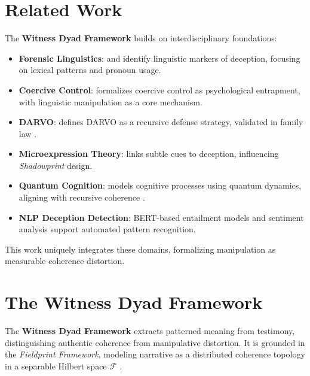 \documentclass[11pt]{article}
\newcommand{\shadowprint}{\textit{Shadowprint}}
\newcommand{\witnessdyad}{\textbf{Witness Dyad Framework}}
\begin{document}
\section{Related Work}
\label{sec:related}
The \witnessdyad{} builds on interdisciplinary foundations:
\begin{itemize}
    \item \textbf{Forensic Linguistics}: \citet{pennebaker2003} and \citet{hancock2013} identify linguistic markers of deception, focusing on lexical patterns and pronoun usage.
    \item \textbf{Coercive Control}: \citet{stark2007} formalizes coercive control as psychological entrapment, with linguistic manipulation as a core mechanism.
    \item \textbf{DARVO}: \citet{freyd1997} defines DARVO as a recursive defense strategy, validated in family law \citep{meier2010}.
    \item \textbf{Microexpression Theory}: \citet{ekman2003} links subtle cues to deception, influencing \shadowprint{} design.
    \item \textbf{Quantum Cognition}: \citet{busemeyer2012} models cognitive processes using quantum dynamics, aligning with recursive coherence \citep{havens2025a}.
    \item \textbf{NLP Deception Detection}: BERT-based entailment models \citep{devlin2019} and sentiment analysis \citep{hutto2014} support automated pattern recognition.
\end{itemize}
This work uniquely integrates these domains, formalizing manipulation as measurable coherence distortion.

\section{The Witness Dyad Framework}
\label{sec:framework}
The \witnessdyad{} extracts patterned meaning from testimony, distinguishing authentic coherence from manipulative distortion. It is grounded in the \textit{Fieldprint Framework}, modeling narrative as a distributed coherence topology in a separable Hilbert space \(\mathcal{F}\) \citep{havens2025b}.
\end{document}
